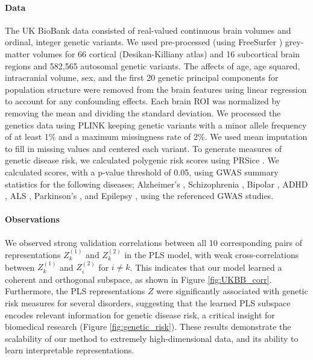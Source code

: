 \paragraph{Data} The UK BioBank data consisted of real-valued continuous brain volumes and ordinal, integer genetic variants.
We used pre-processed (using FreeSurfer \citep{Fischl2012}) grey-matter volumes for 66 cortical (Desikan-Killiany atlas) and 16 subcortical brain regions and 582,565 autosomal genetic variants.
The affects of age, age squared, intracranial volume, sex, and the first 20 genetic principal components for population structure were removed from the brain features using linear regression to account for any confounding effects.
Each brain ROI was normalized by removing the mean and dividing the standard deviation.
We processed the genetics data using PLINK \citep{Purcell2007} keeping genetic variants with a minor allele frequency of at least 1\%  and a maximum missingness rate of 2\%.
We used mean imputation to fill in missing values and centered each variant.
To generate measures of genetic disease risk, we calculated polygenic risk scores using PRSice \citep{PRSice2014}.
We calculated scores, with a p-value threshold of 0.05, using GWAS summary statistics for the following diseases; Alzheimer's \citep{Lambert2013}, Schizophrenia \citep{Trubetskoy2022}, Bipolar \citep{Mullins2021}, ADHD \citep{Demontis2023}, ALS \citep{Van_Rheenen2021}, Parkinson's \citep{Nalls2019}, and Epilepsy \citep{International_League_Against_Epilepsy_Consortium_on_Complex_Epilepsies2018}, using the referenced GWAS studies.

\paragraph{Observations}
We observed strong validation correlations between all 10 corresponding pairs of representations \( Z^{(1)}_k \) and \( Z^{(2)}_k \) in the PLS model, with weak cross-correlations between \( Z^{(1)}_k \) and \( Z^{(2)}_i \) for \( i \neq k \).
This indicates that our model learned a coherent and orthogonal subspace, as shown in Figure \ref{fig:UKBB_corr}.
Furthermore, the PLS representations \( Z \) were significantly associated with genetic risk measures for several disorders, suggesting that the learned PLS subspace encodes relevant information for genetic disease risk, a critical insight for biomedical research (Figure \ref{fig:genetic_risk}). These results demonstrate the scalability of our method to extremely high-dimensional data, and its ability to learn interpretable representations.

